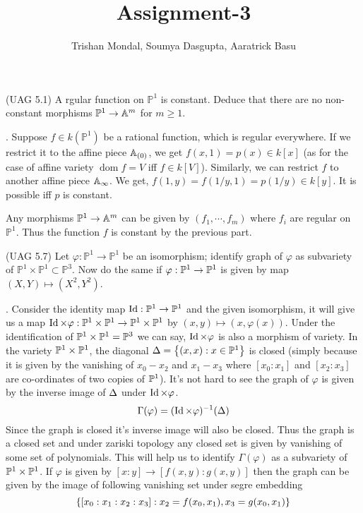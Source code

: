 \documentclass[12pt]{article}
\title{Assignment-3}
\author{Trishan Mondal, Soumya Dasgupta, Aaratrick Basu}
\date{}
\begin{document}
 \maketitle
 \setcounter{section}{3}

 \begin{prob} %
  (UAG 5.1) A rgular function on $\mathbb{P}^1$ is constant. Deduce that there are no non-constant morphisms $\mathbb{P}^1 \to \mathbb{A}^m$ for $m \geq 1$.
 \end{prob}

\sol. Suppose  $f \in k(\mathbb{P}^1)$ be a rational function, which is regular everywhere. If we restrict it to the affine piece $\mathbb{A}_{(0)}$, we get $f(x,1) = p(x) \in k[x]$ (as for the case of affine variety $\operatorname{dom} f = V$ iff $f \in k[V]$). Similarly, we can restrict $f$ to another affine piece $\mathbb{A}_{\infty}$. We get, $f(1,y) = f(1/y,1) = p(1/y) \in k[y]$. It is possible iff $p$ is constant.

\vspace*{0.2cm}

\noindent Any morphisms  $\mathbb{P}^1 \to \mathbb{A}^m$ can be given by $(f_1,\cdots,f_m)$ where $f_i$ are regular on $\mathbb{P}^1$. Thus the function $f$ is constant by the previous part. \Qed

\begin{prob} %
    (UAG 5.7) Let $\varphi : \mathbb{P}^1 \to \mathbb{P}^1$ be an isomorphism; identify graph of $\varphi$ as subvariety of $\mathbb{P}^1 \times \mathbb{P}^1\subset \mathbb{P}^3$. Now do the same if $\varphi : \mathbb{P}^1 \to \mathbb{P}^1$ is given by map $(X,Y)\mapsto (X^2,Y^2)$.
\end{prob} 

\sol. Consider the identity map $\operatorname{Id} : \mathbb{P}^1 \to \mathbb{P}^1$ and the given isomorphism, it will give us a map $\operatorname{Id} \times \varphi :\mathbb{P}^1 \times \mathbb{P}^1 \to \mathbb{P}^1\times \mathbb{P}^1$ by $(x,y)\mapsto (x,\varphi(x))$. Under the identification of $\mathbb{P}^1 \times \mathbb{P}^1 = \mathbb{P}^3$ we can say, $\operatorname{Id} \times \varphi$ is also a morphism of variety. In the variety $\mathbb{P}^1 \times \mathbb{P}^1$, the diagonal $\Delta = \qty{(x,x): x \in \mathbb{P}^1}$ is closed (simply because it is given by the vanishing of $x_0-x_2$ and $x_1-x_3$ where $[x_0:x_1]$ and $[x_2:x_3]$ are co-ordinates of two copies of $\mathbb{P}^1$). It's not hard to see the graph of $\varphi$ is given by the inverse image of $\Delta$ under $\operatorname{Id} \times \varphi$. $$\Gamma(\varphi)= (\operatorname{Id} \times \varphi)^{- 1}(\Delta)$$ Since the graph is closed it's inverse image will also be closed. Thus the graph is a closed set and under zariski topology any closed set is given by vanishing of some set of polynomials. This will help us to identify $\Gamma(\varphi)$ as a subvariety of $\mathbb{P}^1\times \mathbb{P}^1$. If $\varphi$ is given by $[x:y]\to [f(x,y):g(x,y)]$ then the graph can be given by the image of following vanishing set under segre embedding $$\qty{[x_0:x_1:x_2:x_3]: x_2 =f(x_0,x_1), x_3=g(x_0,x_1)}$$ 
\end{document}
